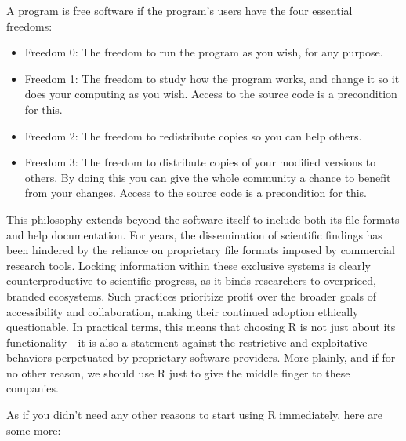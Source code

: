 {
\begin{displayquote}
\headingfont
A program is free software if the program's users have the four essential freedoms:

\begin{itemize}
\item Freedom 0: The freedom to run the program as you wish, for any purpose.
\item Freedom 1: The freedom to study how the program works, and change it so it does your computing as you wish. Access to the source code is a precondition for this.
\item Freedom 2: The freedom to redistribute copies so you can help others.
\item Freedom 3: The freedom to distribute copies of your modified versions to others. By doing this you can give the whole community a chance to benefit from your changes. Access to the source code is a precondition for this.
\end{itemize}
\end{displayquote}
}

This philosophy extends beyond the software itself to include both its file formats and help documentation. For years, the dissemination of scientific findings has been hindered by the reliance on proprietary file formats imposed by commercial research tools. Locking information within these exclusive systems is clearly counterproductive to scientific progress, as it binds researchers to overpriced, branded ecosystems. Such practices prioritize profit over the broader goals of accessibility and collaboration, making their continued adoption ethically questionable. In practical terms, this means that choosing R is not just about its functionality—it is also a statement against the restrictive and exploitative behaviors perpetuated by proprietary software providers. More plainly, and if for no other reason, we should use R just to give the middle finger to these companies.

\noindent As if you didn't need any other reasons to start using R immediately, here are some more:

